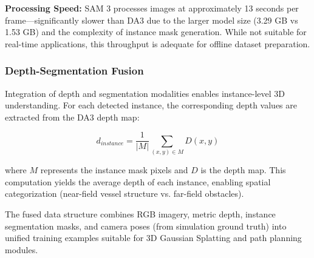 \textbf{Processing Speed:} SAM 3 processes images at approximately 13 seconds per frame---significantly slower than DA3 due to the larger model size (3.29 GB vs 1.53 GB) and the complexity of instance mask generation. While not suitable for real-time applications, this throughput is adequate for offline dataset preparation.

\subsubsection{Depth-Segmentation Fusion}

Integration of depth and segmentation modalities enables instance-level 3D understanding. For each detected instance, the corresponding depth values are extracted from the DA3 depth map:

\begin{equation}
d_{instance} = \frac{1}{|M|} \sum_{(x,y) \in M} D(x,y)
\label{eq:instance_depth}
\end{equation}

where $M$ represents the instance mask pixels and $D$ is the depth map. This computation yields the average depth of each instance, enabling spatial categorization (near-field vessel structure vs. far-field obstacles).

The fused data structure combines RGB imagery, metric depth, instance segmentation masks, and camera poses (from simulation ground truth) into unified training examples suitable for 3D Gaussian Splatting and path planning modules.
